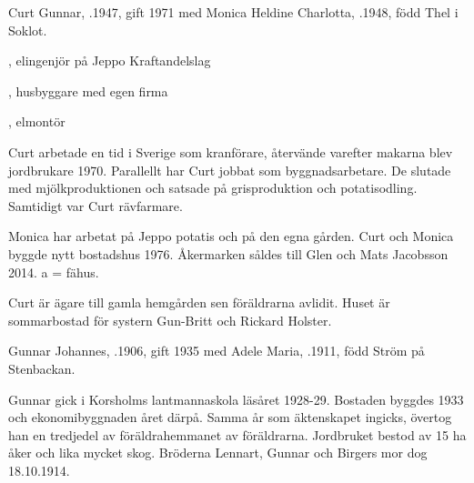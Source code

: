 


Curt Gunnar, .1947, gift 1971 med Monica Heldine Charlotta, .1948, född Thel i Soklot.
\begin{jhchildren}
  \item {}, elingenjör på Jeppo Kraftandelslag
  \item {}, husbyggare med egen firma
  \item {}, elmontör
\end{jhchildren}

Curt arbetade en tid i Sverige som kranförare, återvände varefter makarna blev jordbrukare 1970. Parallellt har Curt jobbat som byggnadsarbetare. De slutade med mjölkproduktionen och satsade på grisproduktion och potatisodling. Samtidigt var Curt rävfarmare.

Monica har 	arbetat på Jeppo potatis och på den egna gården. Curt och Monica byggde nytt bostadshus 1976. Åkermarken såldes till Glen och Mats Jacobsson 2014. a = fähus.






Curt är ägare till gamla hemgården sen föräldrarna avlidit. Huset är sommarbostad för systern Gun-Britt och Rickard Holster.\jhvspace{}


Gunnar Johannes, .1906, gift 1935 med Adele Maria, .1911, född Ström på Stenbackan.
\begin{jhchildren}
  \item {}
  \item {}
  \item {}
  \item {}
\end{jhchildren}
Gunnar gick i Korsholms lantmannaskola läsåret 1928-29. Bostaden byggdes 1933 och ekonomibyggnaden året därpå. Samma år som äktenskapet ingicks, övertog han en tredjedel av föräldrahemmanet av föräldrarna. Jordbruket bestod av 15 ha åker och lika mycket skog. Bröderna Lennart, Gunnar och Birgers mor dog 18.10.1914.

